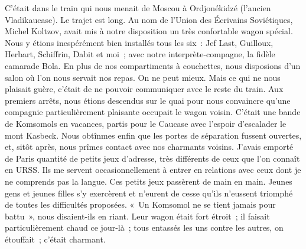 \documentclass[french,twoside]{book} %
\newcommand{\astermono}{\medskip\centerline{\color{rubric}\large\selectfont{\syms ✻}}\medskip\par}%
\begin{document}
\astermono

\noindent C’était dans le train qui nous menait de Moscou à Ordjonékidzé (l’ancien Vladikaucase). Le trajet est long. Au nom de l’Union des Écrivains Soviétiques, Michel Koltzov, avait mis à notre disposition un très confortable wagon spécial. Nous y étions inespérément bien installés tous les six : Jef Last, Guilloux, Herbart, Schiffrin, Dabit et moi ; avec notre interprète-compagne, la fidèle camarade Bola. En plus de nos compartiments à couchettes, nous disposions d’un salon où l’on nous servait nos repas. On ne peut mieux. Mais ce qui ne nous plaisait guère, c’était de ne pouvoir communiquer avec le reste du train. Aux premiers arrêts, nous étions descendus sur le quai pour nous convaincre qu’une compagnie particulièrement plaisante occupait le wagon voisin. C’était une bande de Komsomols en vacances, partis pour le Caucase avec l’espoir d’escalader le mont Kasbeck. Nous obtînmes enfin que les portes de séparation fussent ouvertes, et, sitôt après, nous prîmes contact avec nos charmants voisins. J’avais emporté de Paris quantité de petits jeux d’adresse, très différents de ceux que l’on connaît en URSS. Ils me servent occasionnellement à entrer en relations avec ceux dont je ne comprends pas la langue. Ces petits jeux passèrent de main en main. Jeunes gens et jeunes filles s’y exercèrent et n’eurent de cesse qu’ils n’eussent triomphé de toutes les difficultés proposées. « Un Komsomol ne se tient jamais pour battu », nous disaient-ils en riant. Leur wagon était fort étroit ; il faisait particulièrement chaud ce jour-là ; tous entassés les uns contre les autres, on étouffait ; c’était charmant.\par
\end{document}
